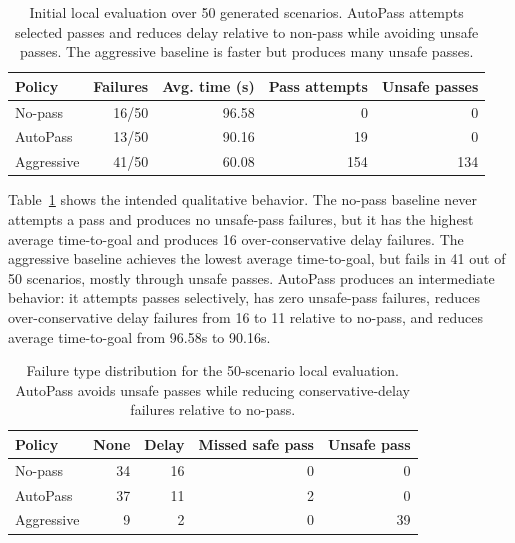 \documentclass[10pt,twocolumn,letterpaper]{article}
\begin{document}
\begin{table}[t]
    \centering
    \small
    \begin{tabular}{lrrrr}
         \toprule
         Policy & Failures & Avg. time (s) & Pass attempts & Unsafe passes \\
         \midrule
         No-pass & 16/50 & 96.58 & 0 & 0 \\
         AutoPass & 13/50 & 90.16 & 19 & 0 \\
         Aggressive & 41/50 & 60.08 & 154 & 134 \\
         \bottomrule
    \end{tabular}
    \vspace{-4pt}
    \caption{Initial local evaluation over 50 generated scenarios. AutoPass attempts selected passes and reduces delay relative to non-pass while avoiding unsafe passes. The aggressive baseline is faster but produces many unsafe passes.}
    \label{tab:initial-results}
    \vspace{-8pt}
\end{table}

Table~\ref{tab:initial-results} shows the intended qualitative behavior. The no-pass baseline never attempts a pass and produces no unsafe-pass failures, but it has the highest average time-to-goal and produces 16 over-conservative delay failures. The aggressive baseline achieves the lowest average time-to-goal, but fails in 41 out of 50 scenarios, mostly through unsafe passes. AutoPass produces an intermediate behavior: it attempts passes selectively, has zero unsafe-pass failures, reduces over-conservative delay failures from 16 to 11 relative to no-pass, and reduces average time-to-goal from 96.58s to 90.16s.

\begin{table}[t]
    \centering
    \small
    \begin{tabular}{lrrrr}
         \toprule
         Policy & None & Delay & Missed safe pass & Unsafe pass \\
         \midrule
         No-pass & 34 & 16 & 0 & 0 \\
         AutoPass & 37 & 11 & 2 & 0 \\
         Aggressive & 9 & 2 & 0 & 39 \\
         \bottomrule
    \end{tabular}
    \vspace{-4pt}
    \caption{Failure type distribution for the 50-scenario local evaluation. AutoPass avoids unsafe passes while reducing conservative-delay failures relative to no-pass.}
    \label{tab:failure-types}
    \vspace{-8pt}
\end{table}
\end{document}
